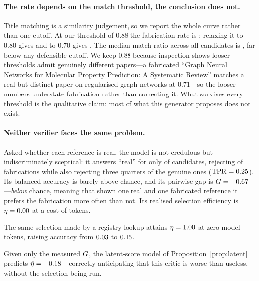 \paragraph{The rate depends on the match threshold, the conclusion does not.}
Title matching is a similarity judgement, so we report the whole curve rather
than one cutoff. At our threshold of $0.88$ the fabrication rate is
\citHallucRate{}; relaxing it to $0.80$ gives \citHallucMid{} and to $0.70$
gives \citHallucLoose{}. The median match ratio across all candidates is
\citMedianRatio{}, far below any defensible cutoff. We keep $0.88$ because
inspection shows looser thresholds admit genuinely different papers---a
fabricated ``Graph Neural Networks for Molecular Property Prediction: A
Systematic Review'' matches a real but distinct paper on regularised graph
networks at $0.71$---so the looser numbers understate fabrication rather than
correcting it. What survives every threshold is the qualitative claim: most of
what this generator proposes does not exist.

\paragraph{Neither verifier faces the same problem.}
\begin{description}[leftmargin=0pt,itemsep=1pt,topsep=2pt,font=\normalfont\itshape]
\item[The model as its own critic.] Asked whether each reference is real, the
  model is not credulous but indiscriminately sceptical: it answers ``real''
  for only \citSaysReal{} of candidates, rejecting \citTNR{} of fabrications
  while also rejecting three quarters of the genuine ones
  ($\mathrm{TPR}=0.25{}$). Its balanced accuracy is barely above chance, and
  its pairwise gap is $G = -0.67{}$---\emph{below} chance, meaning that
  shown one real and one fabricated reference it prefers the fabrication more
  often than not. Its realised selection efficiency is $\eta = 0.00{}$
  at a cost of \citLLMTokens{} tokens.
\item[The external registry.] The same selection made by a registry lookup
  attains $\eta = 1.00{}$ at zero model tokens, raising accuracy from
  $0.03{}$ to $0.15{}$.
\end{description}

Given only the measured $G$, the latent-score model of
Proposition~\ref{prop:latent} predicts $\hat{\eta} = -0.18{}$---correctly
anticipating that this critic is worse than useless, without the selection
being run.

